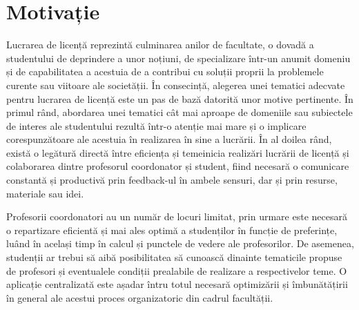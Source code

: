 \chapter*{Motivație} 

Lucrarea de licență reprezintă culminarea anilor de facultate, o dovadă a studentului de deprindere a unor noțiuni, de specializare într-un anumit domeniu și de capabilitatea a acestuia de a contribui cu soluții proprii la problemele curente sau viitoare ale societății. În consecință, alegerea unei tematici adecvate pentru lucrarea de licență este un pas de bază datorită unor motive pertinente.
În primul rând, abordarea unei tematici cât mai aproape de domeniile sau subiectele de interes ale studentului rezultă într-o atenție mai mare și o implicare corespunzătoare ale acestuia în realizarea în sine a lucrării.
În al doilea rând, există o legătură directă între eficiența și temeinicia realizări lucrării de licență și colaborarea dintre profesorul coordonator și student, fiind necesară o comunicare constantă și productivă prin feedback-ul în ambele sensuri, dar și prin resurse, materiale sau idei.

Profesorii coordonatori au un număr de locuri limitat, prin urmare este necesară o repartizare eficientă și mai ales optimă a studenților în funcție de preferințe, luând în același timp în calcul și punctele de vedere ale profesorilor. De asemenea, studenții ar trebui să aibă posibilitatea să cunoască dinainte tematicile propuse de profesori și eventualele condiții prealabile de realizare a respectivelor teme. O aplicație centralizată este așadar întru totul necesară optimizării și îmbunătățirii în general ale acestui proces organizatoric din cadrul facultății.